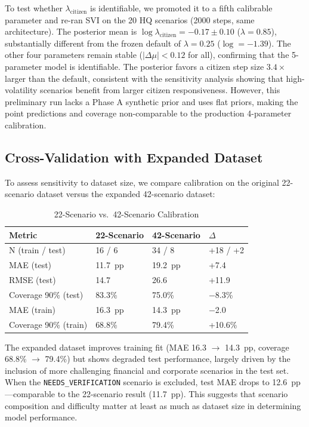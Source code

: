\documentclass[12pt]{article}
\begin{document}
To test whether $\lambda_{\text{citizen}}$ is identifiable, we promoted it to a fifth calibrable parameter and re-ran SVI on the 20 HQ scenarios (2000 steps, same architecture). The posterior mean is $\log \lambda_{\text{citizen}} = -0.17 \pm 0.10$ ($\lambda = 0.85$), substantially different from the frozen default of $\lambda = 0.25$ ($\log = -1.39$). The other four parameters remain stable ($|\Delta\mu| < 0.12$ for all), confirming that the 5-parameter model is identifiable. The posterior favors a citizen step size $3.4\times$ larger than the default, consistent with the sensitivity analysis showing that high-volatility scenarios benefit from larger citizen responsiveness. However, this preliminary run lacks a Phase A synthetic prior and uses flat priors, making the point predictions and coverage non-comparable to the production 4-parameter calibration.

\subsection{Cross-Validation with Expanded Dataset}

To assess sensitivity to dataset size, we compare calibration on the original 22-scenario dataset versus the expanded 42-scenario dataset:

\begin{table}[H]
\centering
\caption{22-Scenario vs.\ 42-Scenario Calibration}
\label{tab:crossval}
\begin{tabular}{llll}
\toprule
Metric & 22-Scenario & 42-Scenario & $\Delta$ \\
\midrule
N (train / test) & 16 / 6 & 34 / 8 & +18 / +2 \\
MAE (test) & 11.7~pp & 19.2~pp & +7.4 \\
RMSE (test) & 14.7 & 26.6 & +11.9 \\
Coverage 90\% (test) & 83.3\% & 75.0\% & $-$8.3\% \\
MAE (train) & 16.3~pp & 14.3~pp & $-$2.0 \\
Coverage 90\% (train) & 68.8\% & 79.4\% & +10.6\% \\
\bottomrule
\end{tabular}
\end{table}

The expanded dataset improves training fit (MAE 16.3 $\to$ 14.3~pp, coverage 68.8\% $\to$ 79.4\%) but shows degraded test performance, largely driven by the inclusion of more challenging financial and corporate scenarios in the test set. When the \texttt{NEEDS\_VERIFICATION} scenario is excluded, test MAE drops to 12.6~pp---comparable to the 22-scenario result (11.7~pp). This suggests that scenario composition and difficulty matter at least as much as dataset size in determining model performance.
\end{document}
